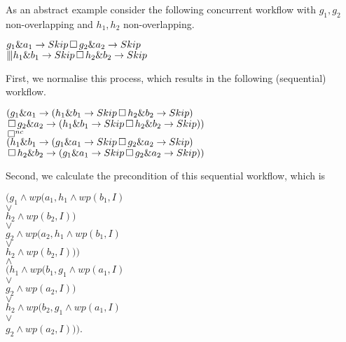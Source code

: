\documentclass[11pt]{article}
\begin{document}
As an abstract example consider the following concurrent workflow with $g_1,g_2$ non-overlapping and $h_1,h_2$ non-overlapping.

\noindent
\hspace*{4pt} $g_1 \& a_1 \rightarrow Skip \, \Box \, g_2 \& a_2 \rightarrow Skip$ \\
$\interleave h_1 \& b_1 \rightarrow Skip \, \Box \, h_2 \& b_2 \rightarrow Skip$

\noindent
First, we normalise this process, which results in the following (sequential) workflow.

\noindent
\hspace*{20pt} $(g_1 \& a_1 \rightarrow (h_1 \& b_1 \rightarrow Skip \, \Box \, h_2 \& b_2 \rightarrow Skip)$ \\
\hspace*{12pt} $\, \Box \, g_2 \& a_2 \rightarrow (h_1 \& b_1 \rightarrow Skip \, \Box \, h_2 \& b_2 \rightarrow Skip))$ \\
$\, \Box^{nc}$ \\ 
\hspace*{20pt} $(h_1 \& b_1 \rightarrow (g_1 \& a_1 \rightarrow Skip \, \Box \, g_2 \& a_2 \rightarrow Skip)$ \\ 
\hspace*{12pt} $\, \Box \, h_2 \& b_2 \rightarrow (g_1 \& a_1 \rightarrow Skip \, \Box \, g_2 \& a_2 \rightarrow Skip))$

\noindent
Second, we calculate the precondition of this sequential workflow, which is

\noindent
\hspace*{20pt} $(g_1 \land wp(a_1,h_1 \land wp(b_1,I)$ \\
\hspace*{90pt} $\lor$ \\
\hspace*{84pt} $h_2 \land wp(b_2,I))$ \\ 
\hspace*{30pt} $\lor $ \\
\hspace*{25pt} $g_2 \land wp(a_2,h_1 \land wp(b_1,I)$ \\ 
\hspace*{90pt} $\lor$ \\
\hspace*{84pt} $h_2 \land wp(b_2,I)))$ \\
$\land$ \\
\hspace*{20pt} $(h_1 \land wp(b_1,g_1 \land wp(a_1,I)$ \\ 
\hspace*{90pt} $\lor$ \\ 
\hspace*{84pt} $g_2 \land wp(a_2,I))$ \\
\hspace*{30pt} $\lor $ \\
\hspace*{25pt} $h_2 \land wp(b_2,g_1 \land wp(a_1,I)$ \\ 
\hspace*{90pt} $\lor$ \\
\hspace*{84pt} $g_2 \land wp(a_2,I)))$.
\end{document}
